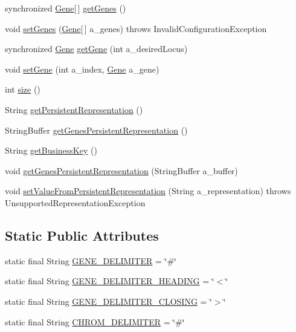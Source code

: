 \begin{DoxyCompactItemize}
synchronized \hyperlink{interfaceorg_1_1jgap_1_1_gene}{Gene}\mbox{[}$\,$\mbox{]} \hyperlink{classorg_1_1jgap_1_1_base_chromosome_a1f9e4971a34546a0d77fa24061e753a0}{get\-Genes} ()
\item 
void \hyperlink{classorg_1_1jgap_1_1_base_chromosome_ac4de43d022e2cc7a7a8ac78ff47ad0a0}{set\-Genes} (\hyperlink{interfaceorg_1_1jgap_1_1_gene}{Gene}\mbox{[}$\,$\mbox{]} a\-\_\-genes)  throws Invalid\-Configuration\-Exception 
\item 
synchronized \hyperlink{interfaceorg_1_1jgap_1_1_gene}{Gene} \hyperlink{classorg_1_1jgap_1_1_base_chromosome_aef0e40ec9b5956389365f5c3144ab207}{get\-Gene} (int a\-\_\-desired\-Locus)
\item 
void \hyperlink{classorg_1_1jgap_1_1_base_chromosome_a8177b71d092d3ce87909d827ec91492a}{set\-Gene} (int a\-\_\-index, \hyperlink{interfaceorg_1_1jgap_1_1_gene}{Gene} a\-\_\-gene)
\item 
int \hyperlink{classorg_1_1jgap_1_1_base_chromosome_a78c8ae0471973855e19a9b79496f2bec}{size} ()
\item 
String \hyperlink{classorg_1_1jgap_1_1_base_chromosome_ab4a4ad55945458548488f87940aa852e}{get\-Persistent\-Representation} ()
\item 
String\-Buffer \hyperlink{classorg_1_1jgap_1_1_base_chromosome_a124394f7e5c4651e59dd1475e0d2c3b0}{get\-Genes\-Persistent\-Representation} ()
\item 
String \hyperlink{classorg_1_1jgap_1_1_base_chromosome_aa35172e2b9535ace3b8fa31c1b2ef2fe}{get\-Business\-Key} ()
\item 
void \hyperlink{classorg_1_1jgap_1_1_base_chromosome_a2bef76845dd6e92c09037dae72e7ca15}{get\-Genes\-Persistent\-Representation} (String\-Buffer a\-\_\-buffer)
\item 
void \hyperlink{classorg_1_1jgap_1_1_base_chromosome_a30276dc8afb0bd632c288bf7d2e18b55}{set\-Value\-From\-Persistent\-Representation} (String a\-\_\-representation)  throws Unsupported\-Representation\-Exception 
\end{DoxyCompactItemize}
\subsection*{Static Public Attributes}
\begin{DoxyCompactItemize}
\item 
static final String \hyperlink{classorg_1_1jgap_1_1_base_chromosome_a5cb3ac5d20e1fccb7eacdd0bb38bd650}{G\-E\-N\-E\-\_\-\-D\-E\-L\-I\-M\-I\-T\-E\-R} = \char`\"{}\#\char`\"{}
\item 
static final String \hyperlink{classorg_1_1jgap_1_1_base_chromosome_a52428dfc927129c8960a9d9ca3864346}{G\-E\-N\-E\-\_\-\-D\-E\-L\-I\-M\-I\-T\-E\-R\-\_\-\-H\-E\-A\-D\-I\-N\-G} = \char`\"{}$<$\char`\"{}
\item 
static final String \hyperlink{classorg_1_1jgap_1_1_base_chromosome_a05f3c0c0caa0e1676345b2303c842be0}{G\-E\-N\-E\-\_\-\-D\-E\-L\-I\-M\-I\-T\-E\-R\-\_\-\-C\-L\-O\-S\-I\-N\-G} = \char`\"{}$>$\char`\"{}
\item 
static final String \hyperlink{classorg_1_1jgap_1_1_base_chromosome_a4efa73cb7ff2c5dcd0e16f1d7287dc78}{C\-H\-R\-O\-M\-\_\-\-D\-E\-L\-I\-M\-I\-T\-E\-R} = \char`\"{}\#\char`\"{}
\end{DoxyCompactItemize}
